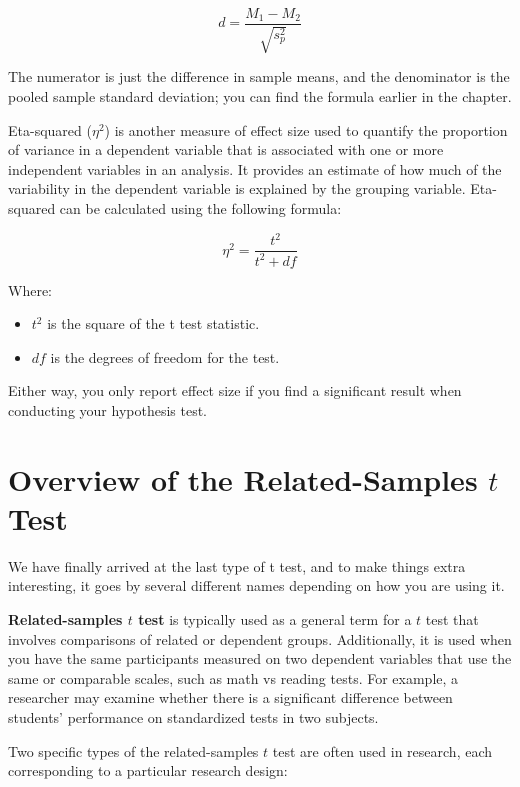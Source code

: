 \documentclass[
  letterpaper,
  DIV=11,
  numbers=noendperiod]{scrreprt}
\begin{document}
\[
d=\frac{M_1-M_2}{\sqrt{s_p^2}}
\]

The numerator is just the difference in sample means, and the
denominator is the pooled sample standard deviation; you can find the
formula earlier in the chapter.

Eta-squared (\(\eta^2\)) is another measure of effect size used to
quantify the proportion of variance in a dependent variable that is
associated with one or more independent variables in an analysis. It
provides an estimate of how much of the variability in the dependent
variable is explained by the grouping variable. Eta-squared can be
calculated using the following formula:

\[
\eta^2=\frac{t^2}{t^2+df}
\]

Where:

\begin{itemize}
\item
  \(t^2\) is the square of the t test statistic.
\item
  \(df\) is the degrees of freedom for the test.
\end{itemize}

Either way, you only report effect size if you find a significant result
when conducting your hypothesis test.

\section{\texorpdfstring{Overview of the Related-Samples \(t\)
Test}{Overview of the Related-Samples t Test}}\label{overview-of-the-related-samples-t-test}

We have finally arrived at the last type of t test, and to make things
extra interesting, it goes by several different names depending on how
you are using it.

\textbf{Related-samples \(t\) test} is typically used as a general term
for a \(t\) test that involves comparisons of related or dependent
groups. Additionally, it is used when you have the same participants
measured on two dependent variables that use the same or comparable
scales, such as math vs reading tests. For example, a researcher may
examine whether there is a significant difference between students'
performance on standardized tests in two subjects.

Two specific types of the related-samples \(t\) test are often used in
research, each corresponding to a particular research design:
\end{document}
